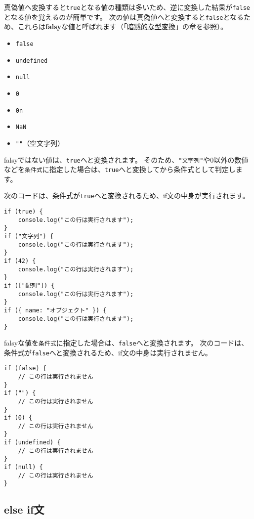 真偽値へ変換すると\texttt{true}となる値の種類は多いため、逆に変換した結果が\texttt{false}となる値を覚えるのが簡単です。
次の値は真偽値へと変換すると\texttt{false}となるため、これらは\textbf{falsy}な値と呼ばれます（「\hyperlink{implicit-coercion}{暗黙的な型変換}」の章を参照）。

\begin{itemize}
\item
  \texttt{false}
\item
  \texttt{undefined}
\item
  \texttt{null}
\item
  \texttt{0}
\item
  \texttt{0n}
\item
  \texttt{NaN}
\item
  \texttt{""}（空文字列）
\end{itemize}

falsyではない値は、\texttt{true}へと変換されます。
そのため、\texttt{"文字列"}や0以外の数値などを\texttt{条件式}に指定した場合は、\texttt{true}へと変換してから条件式として判定します。

次のコードは、条件式が\texttt{true}へと変換されるため、if文の中身が実行されます。

\begin{lstlisting}
if (true) {
    console.log("この行は実行されます");
}
if ("文字列") {
    console.log("この行は実行されます");
}
if (42) {
    console.log("この行は実行されます");
}
if (["配列"]) {
    console.log("この行は実行されます");
}
if ({ name: "オブジェクト" }) {
    console.log("この行は実行されます");
}
\end{lstlisting}

falsyな値を\texttt{条件式}に指定した場合は、\texttt{false}へと変換されます。
次のコードは、条件式が\texttt{false}へと変換されるため、if文の中身は実行されません。

\begin{lstlisting}
if (false) {
    // この行は実行されません
}
if ("") {
    // この行は実行されません
}
if (0) {
    // この行は実行されません
}
if (undefined) {
    // この行は実行されません
}
if (null) {
    // この行は実行されません
}
\end{lstlisting}

\hypertarget{else-if-statement}{%
\subsection{else if文}\label{else-if-statement}}


